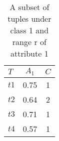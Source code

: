 \begin{table}[!htbp]
\caption{A subset of tuples under class 1 and range r of attribute 1}
\label{table:table2_3}
\centering
\begin{tabular}{lcc}
	\toprule
	\textbf{$\mathit{T}$} & \textbf{$\mathit{A_1}$}   & \textbf{$\mathit{C}$} \\
	\midrule
	$\mathit{t1}$ & 0.75 & 1 \\
	$\mathit{t2}$ & 0.64 & 2 \\
	$\mathit{t3}$ & 0.71 & 1 \\
	$\mathit{t4}$ & 0.57 & 1 \\
	\bottomrule
\end{tabular} 
\end{table}
